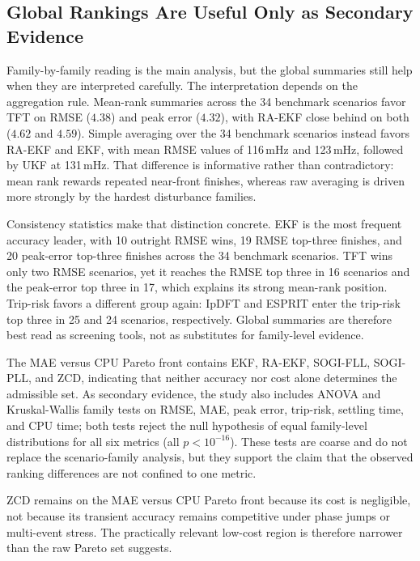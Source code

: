 \subsection{Global Rankings Are Useful Only as Secondary Evidence}

Family-by-family reading is the main analysis, but the global summaries still
help when they are interpreted carefully. The interpretation depends on the
aggregation rule. Mean-rank summaries across the 34 benchmark scenarios favor
TFT on RMSE ($4.38$) and peak error
($4.32$), with RA-EKF close behind on both ($4.62$ and $4.59$). Simple
averaging over the 34 benchmark scenarios instead favors RA-EKF and EKF,
with mean RMSE values of 116\,mHz and 123\,mHz, followed by UKF at 131\,mHz.
That difference is informative rather than contradictory: mean rank rewards
repeated near-front finishes, whereas raw averaging is driven more strongly by
the hardest disturbance families.

Consistency statistics make that distinction concrete. EKF is the most frequent
accuracy leader, with 10 outright RMSE wins, 19 RMSE top-three finishes, and
20 peak-error top-three finishes across the 34 benchmark scenarios. TFT wins
only two RMSE scenarios, yet it reaches the RMSE top three in 16 scenarios and
the peak-error top three in 17, which explains its strong mean-rank position.
Trip-risk favors a different group again: IpDFT and ESPRIT enter the trip-risk
top three in 25 and 24 scenarios, respectively. Global summaries are therefore
best read as screening tools, not as substitutes for family-level evidence.

The MAE versus CPU Pareto front contains EKF, RA-EKF, SOGI-FLL, SOGI-PLL, and
ZCD, indicating that neither accuracy nor cost alone determines the admissible
set. As secondary evidence, the study
also includes ANOVA and Kruskal-Wallis family tests on RMSE, MAE, peak error,
trip-risk, settling time, and CPU time; both tests reject the null hypothesis
of equal family-level distributions for all six metrics (all $p<10^{-16}$).
These tests are coarse
and do not replace the scenario-family analysis, but they support the claim
that the observed ranking differences are not confined to one metric.

ZCD remains on the MAE versus CPU Pareto front because its cost is negligible,
not because its transient accuracy remains competitive under phase jumps or
multi-event stress. The practically relevant low-cost region is therefore
narrower than the raw Pareto set suggests.

